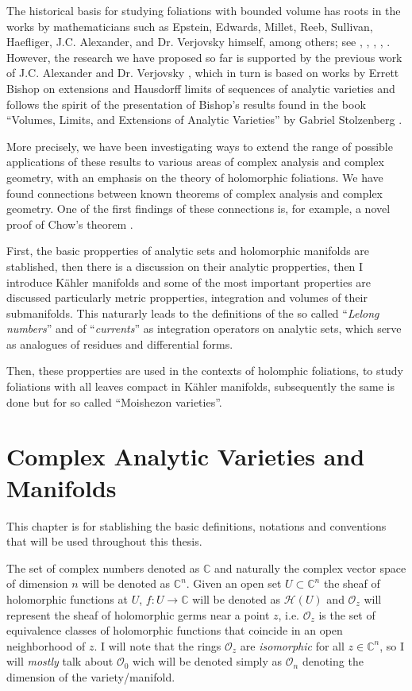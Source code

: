 \documentclass[12pt,twoside,a4paper]{report}
\newcommand{\co}{\ensuremath{\mathbb C }}
\newcommand{\con}{\ensuremath{\mathbb{C}^n}}
\newcommand{\osheaf}{\ensuremath{\mathcal O }}
\begin{document}
The historical basis for studying foliations with bounded volume has roots in the works by mathematicians such as Epstein, Edwards, Millet, Reeb, Sullivan, Haefliger, J.C. Alexander, and Dr. Verjovsky himself, among others; see \cite{EMS}, \cite{V-A}, \cite{E-V}, \cite{Epstein1}, \cite{Epstein2}. However, the research we have proposed so far is supported by the previous work of J.C. Alexander and Dr. Verjovsky \cite{A-V}, which in turn is based on works by Errett Bishop \cite{Bishop} on extensions and Hausdorff limits of sequences of analytic varieties and follows the spirit of the presentation of Bishop's results found in the book ``Volumes, Limits, and Extensions of Analytic Varieties'' by Gabriel Stolzenberg \cite{Stolzenberg}.

More precisely, we have been investigating ways to extend the range of possible applications of these results to various areas of complex analysis and complex geometry, with an emphasis on the theory of holomorphic foliations. We have found connections between known theorems of complex analysis and complex geometry. One of the first findings of these connections is, for example, a novel proof of Chow's theorem \cite{Chow}.

First, the basic propperties of analytic sets and holomorphic manifolds are stablished, then there is a discussion on their analytic propperties, then I introduce Kähler manifolds and some of the most important properties are discussed particularly metric propperties, integration and volumes of their submanifolds. This naturarly leads to the definitions of the so called ``\emph{Lelong numbers}'' and of ``\emph{currents}'' as integration operators on analytic sets, which serve as analogues of residues and differential forms.

Then, these propperties are used in the contexts of holomphic foliations, to study foliations with all leaves compact in Kähler manifolds, subsequently the same is done but for so called ``Moishezon varieties''.

\chapter{Complex Analytic Varieties and Manifolds}
\pagestyle{fancy}
\fancyhf{}
\fancyhead[LE]{\rightmark}
\fancyhead[RO]{\leftmark}
\fancyfoot[C]{\thepage}
This chapter is for stablishing the basic definitions, notations and conventions that will be used throughout this thesis.

The set of complex numbers denoted as $\co$ and naturally the complex vector space of dimension $n$ will be denoted as $\con$. Given an open set $U\subset\con$ the sheaf of holomorphic functions at $U$, $f:U\rightarrow\co$ will be denoted as $\mathcal{H}(U)$ and $\osheaf_{z}$ will represent the sheaf of holomorphic germs near a point $z$, i.e. $\osheaf_{z}$ is the set of equivalence classes of holomorphic functions that coincide in an open neighborhood of $z$. I will note that the rings $\osheaf_{z}$ are \emph{isomorphic} for all $z\in\con$, so I will \emph{mostly} talk about $\osheaf_{0}$ wich will be denoted simply as $\osheaf_{n}$ denoting the dimension of the variety/manifold.
\end{document}
